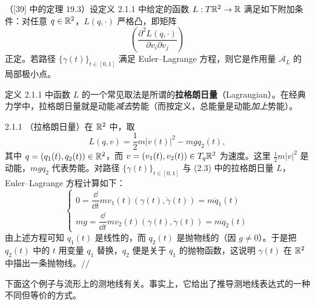 （[39] 中的定理 19.3）\quad 设定义 2.1.1 中给定的函数 $L:T\mathbb{R}^2\to\mathbb{R}$ 满足如下附加条件：对任意 $q\in\mathbb{R}^2$，$L(q,\cdot)$ 严格凸，即矩阵
\[
  \left(\frac{\partial^2L(q,\cdot)}{\partial v_i\partial v_j}\right)
\]
正定。若路径 $\{\gamma(t)\}_{t\in[0,1]}$ 满足 Euler--Lagrange 方程，则它是作用量 $\mathcal{A}_L$ 的局部极小点。

定义 2.1.1 中函数 $L$ 的一个常见取法是所谓的\textbf{拉格朗日量}（Lagrangian）。在经典力学中，拉格朗日量就是动能\emph{减去}势能（而按定义，总能量是动能\emph{加上}势能）。

\begin{wexam}{2.1.1}
（拉格朗日量）在 $\mathbb{R}^2$ 中，取
\begin{equation}
  L(q,v)=\frac12m|v(t)|^2-mgq_2(t),
  \tag{2.3}
\end{equation}
其中 $q=(q_1(t),q_2(t))\in\mathbb{R}^2$，而 $v=(v_1(t),v_2(t))\in T_q\mathbb{R}^2$ 为速度。这里 $\frac12m|v|^2$ 是动能，$mgq_2$ 代表势能。对路径 $\{\gamma(t)\}_{t\in[0,1]}$ 与 (2.3) 中的拉格朗日量 $L$，Euler--Lagrange 方程计算如下：
\[
  \begin{cases}
    0=\dfrac{\dd}{\dd t}mv_1(t)(\gamma(t),\dot\gamma(t))=m\ddot q_1(t)\\[2mm]
    mg=\dfrac{\dd}{\dd t}mv_2(t)(\gamma(t),\dot\gamma(t))=m\ddot q_2(t)
  \end{cases}
\]
由上述方程可知 $q_1(t)$ 是线性的，而 $q_2(t)$ 是抛物线的（因 $g\neq0$）。于是把 $q_2(t)$ 中的 $t$ 用变量 $q_1$ 替换，$q_2$ 便是关于 $q_1$ 的抛物函数，这说明 $\gamma(t)$ 在 $\mathbb{R}^2$ 中描出一条抛物线。\hfill$//$
\end{wexam}

下面这个例子与流形上的测地线有关。事实上，它给出了推导测地线表达式的一种不同但等价的方式。


